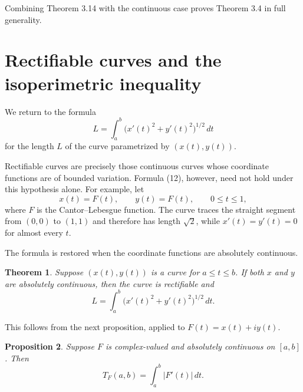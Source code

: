 \documentclass[11pt,openany]{book}
\newtheorem{theorem}{Theorem}[section]
\newtheorem{proposition}[theorem]{Proposition}
\begin{document}
Combining Theorem 3.14 with the continuous case proves Theorem 3.4 in full generality.

\section{Rectifiable curves and the isoperimetric inequality}

We return to the formula
\begin{equation}
L=\int_a^b\bigl(x'(t)^2+y'(t)^2\bigr)^{1/2}\,dt
\tag{12}
\end{equation}
for the length $L$ of the curve parametrized by $(x(t),y(t))$.

Rectifiable curves are precisely those continuous curves whose coordinate functions are of bounded variation. Formula (12), however, need not hold under this hypothesis alone. For example, let
\[
x(t)=F(t),\qquad y(t)=F(t),\qquad 0\le t\le1,
\]
where $F$ is the Cantor--Lebesgue function. The curve traces the straight segment from $(0,0)$ to $(1,1)$ and therefore has length $\sqrt2$, while $x'(t)=y'(t)=0$ for almost every $t$.

The formula is restored when the coordinate functions are absolutely continuous.

\begin{theorem}
Suppose $(x(t),y(t))$ is a curve for $a\le t\le b$. If both $x$ and $y$ are absolutely continuous, then the curve is rectifiable and
\[
L=\int_a^b\bigl(x'(t)^2+y'(t)^2\bigr)^{1/2}\,dt.
\]
\end{theorem}

This follows from the next proposition, applied to $F(t)=x(t)+iy(t)$.

\begin{proposition}
Suppose $F$ is complex-valued and absolutely continuous on $[a,b]$. Then
\[
T_F(a,b)=\int_a^b|F'(t)|\,dt.
\]
\end{proposition}
\end{document}
